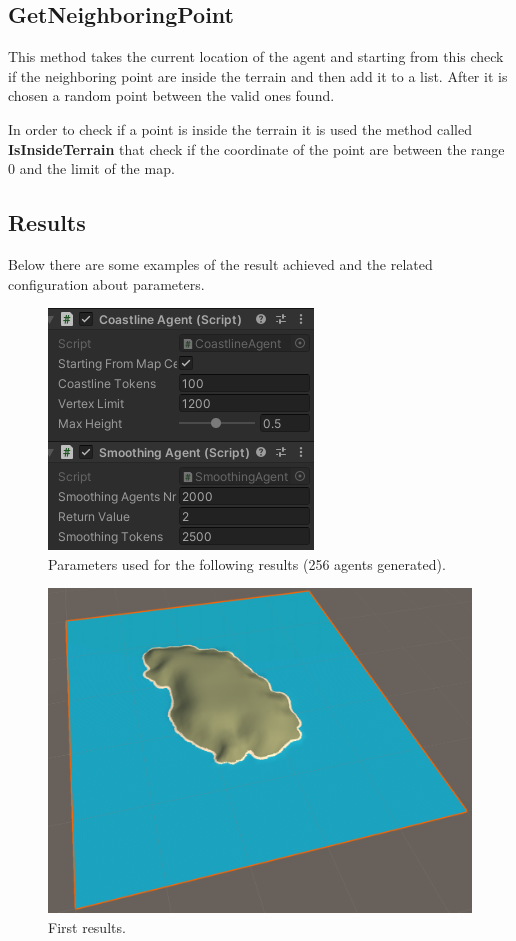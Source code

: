 \documentclass[12pt]{article}
\begin{document}
    \subsection{GetNeighboringPoint}
    This method takes the current location of the agent and starting from this check if the neighboring point are inside the terrain and then add it to a list. After it is chosen a 
    random point between the valid ones found.

    In order to check if a point is inside the terrain it is used the method called \textbf{IsInsideTerrain} that check if the coordinate of the point are between the range 0 and
    the limit of the map.

    \subsection{Results}
    Below there are some examples of the result achieved and the related configuration about parameters.

    \begin{figure}[H]
        \centering
        \includegraphics[scale = 0.8]{images/Smoothing agent/256 agenti/Parameters}
        \caption{Parameters used for the following results (256 agents generated).}
        \label{fig:smoothingParam}
    \end{figure}

    \begin{figure}[H]
        \centering
        \includegraphics[scale = 0.3]{images/Smoothing agent/256 agenti/1}
        \caption{First results.}
    \end{figure}
\end{document}
